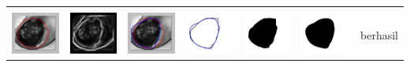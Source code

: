 \begin{table}[H]
\begin{tabular}{|m{0.7in}|m{0.7in}|m{0.7in}|m{0.7in}|m{0.7in}|m{0.7in}|m{0.7in}|}
		&  &  & & & &  \\
		\includegraphics[width=0.7in]{dataset/dataset_3/luka_hitam/ready/17_interp_init.jpg}&
		\includegraphics[width=0.7in]{dataset/dataset_3/luka_hitam/ready/17_interp_ext.jpg}&
		\includegraphics[width=0.7in]{dataset/dataset_3/luka_hitam/ready/17_interp_result.jpg}&
		\includegraphics[width=0.7in]{dataset/dataset_3/luka_hitam/ready/17_gt_r.jpg}&
		\includegraphics[width=0.7in]{dataset/dataset_3/luka_hitam/ready/17_r.jpg}&
		\includegraphics[width=0.7in]{dataset/dataset_3/luka_hitam/ready/17_interp_r.jpg}&
		berhasil\\
		\hline
		

\end{tabular}
\end{table}
